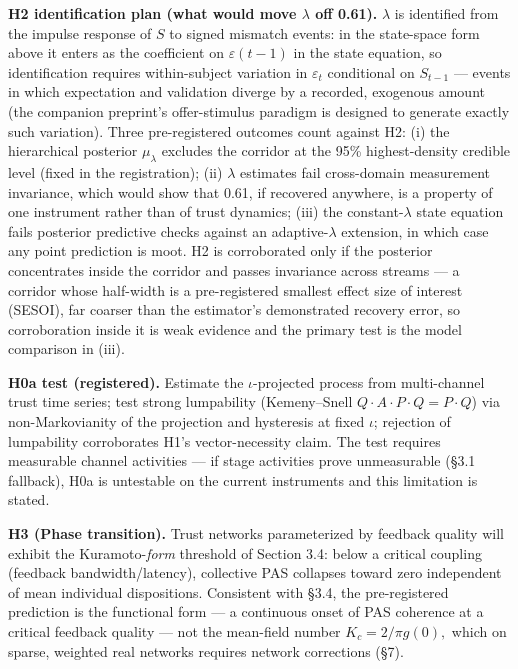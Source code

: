 \documentclass[
]{article}
\begin{document}
\textbf{H2 identification plan (what would move \(\lambda\) off 0.61).}
\(\lambda\) is identified from the impulse response of \(S\) to signed
mismatch events: in the state-space form above it enters as the
coefficient on \(\varepsilon(t-1)\) in the state equation, so
identification requires within-subject variation in \(\varepsilon_t\)
conditional on \(S_{t-1}\) --- events in which expectation and
validation diverge by a recorded, exogenous amount (the companion
preprint's offer-stimulus paradigm is designed to generate exactly such
variation). Three pre-registered outcomes count against H2: (i) the
hierarchical posterior \(\mu_\lambda\) excludes the corridor at the 95\%
highest-density credible level (fixed in the registration); (ii)
\(\lambda\) estimates fail cross-domain measurement invariance, which
would show that 0.61, if recovered anywhere, is a property of one
instrument rather than of trust dynamics; (iii) the constant-\(\lambda\)
state equation fails posterior predictive checks against an
adaptive-\(\lambda\) extension, in which case any point prediction is
moot. H2 is corroborated only if the posterior concentrates inside the
corridor and passes invariance across streams --- a corridor whose
half-width is a pre-registered smallest effect size of interest (SESOI),
far coarser than the estimator's demonstrated recovery error, so
corroboration inside it is weak evidence and the primary test is the
model comparison in (iii).

\textbf{H0a test (registered).} Estimate the \(\iota\)-projected process
from multi-channel trust time series; test strong lumpability
(Kemeny--Snell \(Q \cdot A \cdot P \cdot Q = P \cdot Q\)) via
non-Markovianity of the projection and hysteresis at fixed \(\iota\);
rejection of lumpability corroborates H1's vector-necessity claim. The
test requires measurable channel activities --- if stage activities
prove unmeasurable (§3.1 fallback), H0a is untestable on the current
instruments and this limitation is stated.

\textbf{H3 (Phase transition).} Trust networks parameterized by feedback
quality will exhibit the Kuramoto-\emph{form} threshold of Section 3.4:
below a critical coupling (feedback bandwidth/latency), collective PAS
collapses toward zero independent of mean individual dispositions.
Consistent with §3.4, the pre-registered prediction is the functional
form --- a continuous onset of PAS coherence at a critical feedback
quality --- not the mean-field number \(K_c = 2/\pi g(0),\) which on
sparse, weighted real networks requires network corrections (§7).
\end{document}
